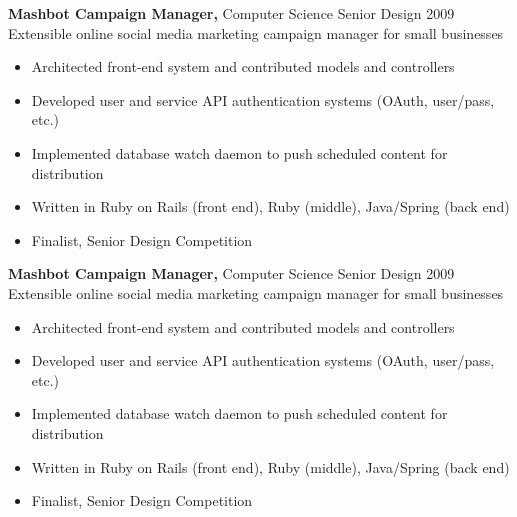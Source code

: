 \documentclass[margin]{res}
\begin{document}
\begin{resume}
\begin{software}
 {\bf Mashbot Campaign Manager,} Computer Science Senior Design \hfill 2009 \\
Extensible online social media marketing campaign manager for small businesses
 \begin{itemize} \itemsep -2pt  %
 \item Architected front-end system and contributed models and controllers
 \item Developed user and service API authentication systems (OAuth, user/pass, etc.)
 \item Implemented database watch daemon to push scheduled content for distribution
 \item Written in Ruby on Rails (front end), Ruby (middle), Java/Spring (back end)
 \item Finalist, Senior Design Competition
 \end{itemize}
\end{software}
\begin{general}
 {\bf Mashbot Campaign Manager,} Computer Science Senior Design \hfill 2009 \\
Extensible online social media marketing campaign manager for small businesses
 \begin{itemize} \itemsep -2pt  %
 \item Architected front-end system and contributed models and controllers
 \item Developed user and service API authentication systems (OAuth, user/pass, etc.)
 \item Implemented database watch daemon to push scheduled content for distribution
 \item Written in Ruby on Rails (front end), Ruby (middle), Java/Spring (back end)
 \item Finalist, Senior Design Competition
 \end{itemize}
\end{general}


\end{resume}
\end{document}
